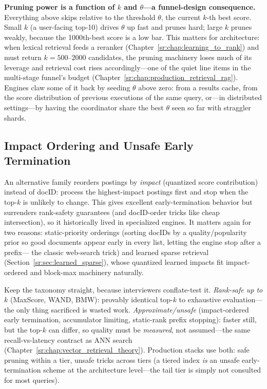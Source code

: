 \textbf{Pruning power is a function of $k$ and $\theta$---a funnel-design consequence.} Everything above skips relative to the threshold $\theta$, the current $k$-th best score. Small $k$ (a user-facing top-10) drives $\theta$ up fast and prunes hard; large $k$ prunes weakly, because the 1000th-best score is a low bar. This matters for architecture: when lexical retrieval feeds a reranker (Chapter~\ref{sr:chap:learning_to_rank}) and must return $k = 500$--$2000$ candidates, the pruning machinery loses much of its leverage and retrieval cost rises accordingly---one of the quiet line items in the multi-stage funnel's budget (Chapter~\ref{sr:chap:production_retrieval_rag}). Engines claw some of it back by seeding $\theta$ above zero: from a results cache, from the score distribution of previous executions of the same query, or---in distributed settings---by having the coordinator share the best $\theta$ seen so far with straggler shards.

\subsection{Impact Ordering and Unsafe Early Termination}

An alternative family reorders postings by \emph{impact} (quantized score contribution) instead of docID: process the highest-impact postings first and stop when the top-$k$ is unlikely to change. This gives excellent early-termination behavior but surrenders rank-safety guarantees (and docID-order tricks like cheap intersection), so it historically lived in specialized engines. It matters again for two reasons: static-priority orderings (sorting docIDs by a quality/popularity prior so good documents appear early in every list, letting the engine stop after a prefix--- the classic web-search trick) and learned sparse retrieval (Section~\ref{sr:sec:learned_sparse}), whose quantized learned impacts fit impact-ordered and block-max machinery naturally.

\begin{keyinsight}
Keep the taxonomy straight, because interviewers conflate-test it. \emph{Rank-safe up to $k$} (MaxScore, WAND, BMW): provably identical top-$k$ to exhaustive evaluation---the only thing sacrificed is wasted work. \emph{Approximate/unsafe} (impact-ordered early termination, accumulator limiting, static-rank prefix stopping): faster still, but the top-$k$ can differ, so quality must be \emph{measured}, not assumed---the same recall-vs-latency contract as ANN search (Chapter~\ref{sr:chap:vector_retrieval_theory}). Production stacks use both: safe pruning within a tier, unsafe tricks across tiers (a tiered index \emph{is} an unsafe early-termination scheme at the architecture level---the tail tier is simply not consulted for most queries).
\end{keyinsight}

